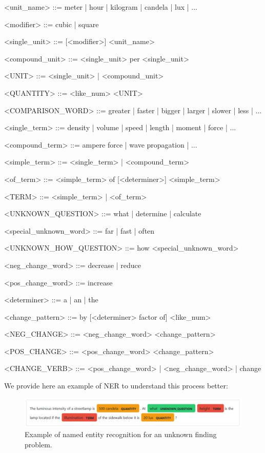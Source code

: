 \documentclass[a4paper, 12pt]{article}
\begin{document}
	\begin{grammar}
		\centering 
		
		<unit\_name> ::= meter | hour | kilogram | candela | lux | ...
		
		<modifier> ::= cubic | square
		
		<single\_unit> ::= [<modifier>] <unit\_name>
		
		<compound\_unit> ::= <single\_unit> per <single\_unit>
		
		<UNIT> ::= <single\_unit> | <compound\_unit>
		
		<QUANTITY> ::= <like\_num> <UNIT>
		
		<COMPARISON\_WORD> ::= greater | faster | bigger | larger | slower | less | ...
		
		<single\_term> ::= density | volume | speed | length | moment | force | ... 
		
		<compound\_term> ::= ampere force | wave propagation | ... 
		
		<simple\_term> ::= <single\_term> | <compound\_term> 
		
		<of\_term> ::= <simple\_term> of [<determiner>] <simple\_term> 
		
		<TERM> ::= <simple_term> | <of_term>
		
		<UNKNOWN\_QUESTION> ::= what | determine | calculate
		
		<special\_unknown\_word> ::= far | fast | often
		
		<UNKNOWN\_HOW\_QUESTION> ::= how <special\_unknown\_word>
		
		<neg\_change\_word> ::= decrease | reduce
		
		<pos\_change\_word> ::= increase
		
		<determiner> ::= a | an | the
		
		<change\_pattern> ::= by [<determiner> factor of] <like_num>
		
		<NEG\_CHANGE> ::= <neg\_change\_word> <change\_pattern>
		
		<POS\_CHANGE> ::= <pos\_change\_word> <change\_pattern>
		
		<CHANGE\_VERB> ::= <pos\_change\_word> | <neg\_change\_word> | change
		
	\end{grammar}
	
	We provide here an example of NER to understand this process better:
	
	\begin{figure}[h]
		\centering
		\includegraphics[width=\textwidth]{media/image3.png}
		\caption{Example of named entity recognition for an unknown finding problem.}
	\end{figure}
	
\end{document}
